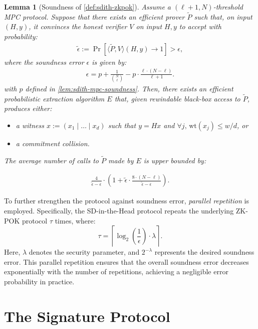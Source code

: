 \documentclass[11pt]{report}
\theoremstyle{definition}
\theoremstyle{plain}
\newtheorem{lemma}{Lemma}[section]
\begin{document}
\begin{lemma}[Soundness of \autoref{def:sdith-zkpok}]
  Assume a $(\ell + 1, N)$-threshold MPC protocol. Suppose that there exists an efficient prover \(\widetilde{P}\) such that, on input \((H, y)\), it convinces the honest verifier \(V\) on input \(H, y\) to accept with probability:
  \begin{align*}
    \widetilde{\epsilon} := \Pr\left[ \langle \widetilde{P}, V \rangle(H, y) \to 1 \right] > \epsilon,
  \end{align*}
  where the soundness error \(\epsilon\) is given by:
  \begin{align*}
    \epsilon = p + \frac{1}{\binom{N}{\ell}} - p \cdot \frac{\ell \cdot (N - \ell)}{\ell + 1}.
  \end{align*}
  with \(p\) defined in \autoref{lem:sdith-mpc-soundness}. Then, there exists an efficient probabilistic extraction algorithm \(E\) that, given rewindable black-box access to \(\widetilde{P}\), produces either:
  \begin{itemize}
    \item a witness \( x := (x_1 \mid \dots \mid x_d) \) such that \( y = Hx \) and \(\forall j, \, \text{wt}(x_j) \leq w/d \), or
    \item a commitment collision.
  \end{itemize}
  The average number of calls to \(\widetilde{P}\) made by \(E\) is upper bounded by:

  \begin{align*}
    \frac{4}{\widetilde{\epsilon} - \epsilon} \cdot
    \left( 1 + \widetilde{\epsilon} \cdot \frac{8 \cdot (N-\ell)}{\widetilde{\epsilon} - \epsilon} \right).
  \end{align*}

\end{lemma}

To further strengthen the protocol against soundness error, \textit{parallel repetition} is employed. Specifically, the SD-in-the-Head protocol repeats the underlying ZK-POK protocol \(\tau\) times, where:
\[
  \tau = \left\lceil \log_2\left(\frac{1}{\epsilon}\right) \cdot \lambda \right\rceil.
\]
Here, \(\lambda\) denotes the security parameter, and \(2^{-\lambda}\) represents the desired soundness error. This parallel repetition ensures that the overall soundness error decreases exponentially with the number of repetitions, achieving a negligible error probability in practice.

\section{The Signature Protocol}\label{sec:sdith-signature}
\end{document}
